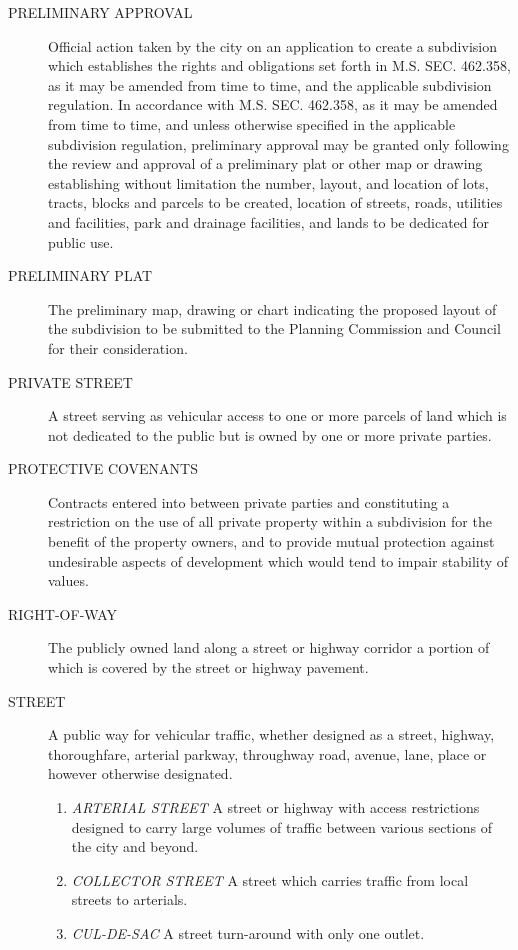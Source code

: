 \begin{description}
    \item[PRELIMINARY APPROVAL] Official action taken by the city on an application to create a subdivision which establishes the rights and obligations set forth in M.S. SEC. 462.358, as it may be amended from time to time, and the applicable subdivision regulation.  In accordance with M.S. SEC. 462.358, as it may be amended from time to time, and unless otherwise specified in the applicable subdivision regulation, preliminary approval may be granted only following the review and approval of a preliminary plat or other map or drawing establishing without limitation the number, layout, and location of lots, tracts, blocks and parcels to be created, location of streets, roads, utilities and facilities, park and drainage facilities, and lands to be dedicated for public use.
    \item[PRELIMINARY PLAT] The preliminary map, drawing or chart indicating the proposed layout of the subdivision to be submitted to the Planning Commission and Council for their consideration.
    \item[PRIVATE STREET] A street serving as vehicular access to one or more parcels of land which is not dedicated to the public but is owned by one or more private parties.
    \item[PROTECTIVE COVENANTS] Contracts entered into between private parties and constituting a restriction on the use of all private property within a subdivision for the benefit of the property owners, and to provide mutual protection against undesirable aspects of development which would tend to impair stability of values.
    \item[RIGHT-OF-WAY] The publicly owned land along a street or highway corridor a portion of which is covered by the street or highway pavement.
    \item[STREET] A public way for vehicular traffic, whether designed as a street, highway, thoroughfare, arterial parkway, throughway road, avenue, lane, place or however otherwise designated.
        \begin{enumerate}
            \item \emph{ARTERIAL STREET} A street or highway with access restrictions designed to carry large volumes of traffic between various sections of the city and beyond.
            \item \emph{COLLECTOR STREET} A street which carries traffic from local streets to arterials.
            \item \emph{CUL-DE-SAC} A street turn-around with only one outlet.

\end{enumerate}
\end{description}
